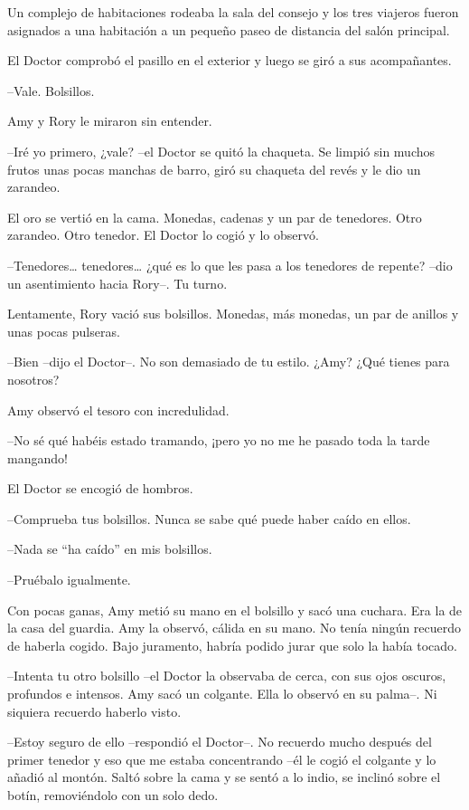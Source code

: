 \mbox{}

{Un complejo de habitaciones rodeaba la sala del consejo y los tres
	viajeros fueron asignados a una habitación a un pequeño paseo de
distancia del salón principal.}

{El Doctor comprobó el pasillo en el exterior y luego se giró a sus
acompañantes.}

{--Vale. Bolsillos.}

{Amy y Rory le miraron sin entender.}

{--Iré yo primero, ¿vale? --el Doctor se quitó la chaqueta. Se limpió
	sin muchos frutos unas pocas manchas de barro, giró su chaqueta del
revés y le dio un zarandeo.}

{El oro se vertió en la cama. Monedas, cadenas y un par de tenedores.
Otro zarandeo. Otro tenedor. El Doctor lo cogió y lo observó.}

{--Tenedores\ldots{} tenedores\ldots{} ¿qué es lo que les pasa a los
tenedores de repente? --dio un asentimiento hacia Rory--. Tu turno.}

{Lentamente, Rory vació sus bolsillos. Monedas, más monedas, un par de
anillos y unas pocas pulseras.}

{--Bien --dijo el Doctor--. No son demasiado de tu estilo. ¿Amy? ¿Qué
tienes para nosotros?}

{Amy observó el tesoro con incredulidad.}

{--No sé qué habéis estado tramando, ¡pero yo no me he pasado toda la
tarde mangando!}

{El Doctor se encogió de hombros.}

{--Comprueba tus bolsillos. Nunca se sabe qué puede haber caído en
ellos.}

{--Nada se ``ha caído'' en mis bolsillos.}

{--Pruébalo igualmente.}

{Con pocas ganas, Amy metió su mano en el bolsillo y sacó una cuchara.
	Era la de la casa del guardia. Amy la observó, cálida en su mano. No
	tenía ningún recuerdo de haberla cogido. Bajo juramento, habría podido
jurar que solo la había tocado.}

{--Intenta tu otro bolsillo --el Doctor la observaba de cerca, con sus
	ojos oscuros, profundos e intensos. Amy sacó un colgante. Ella lo
observó en su palma--. Ni siquiera recuerdo haberlo visto.}

{--Estoy seguro de ello --respondió el Doctor--. No recuerdo mucho
	después del primer tenedor y eso que me estaba concentrando --él le
	cogió el colgante y lo añadió al montón. Saltó sobre la cama y se sentó
a lo indio, se inclinó sobre el botín, removiéndolo con un solo dedo.}

